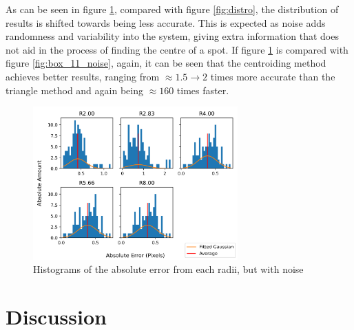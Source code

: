\documentclass[aps,pra,a4paper,nofootinbib,onecolumn,tightenlines,longbibliography,12pt,amsfonts,amssymb,amsmath,floatfix]{revtex4-2} %
\begin{document}
  As can be seen in figure \ref{fig:distro_noise}, compared with figure \ref{fig:distro}, the distribution
  of results is shifted towards being less accurate. This is expected as noise adds randomness and 
  variability into the system, giving extra information that does not aid in the process of finding the 
  centre of a spot. If figure \ref{fig:distro_noise} is compared with figure \ref{fig:box_11_noise}, again, 
  it can be seen that the centroiding method achieves better results, ranging from $\approx 1.5\rightarrow 2$
  times more accurate than the triangle method and again being $\approx 160$ times faster.

  \begin{figure}[H]
    \begin{center}
      \includegraphics[width=0.7\textwidth]{project_pics/distro_noise.png}
    \end{center}
    \caption{Histograms of the absolute error from each radii, but with noise}
    \label{fig:distro_noise}
  \end{figure}


\section{Discussion} %
\label{sec:Discussion}
\end{document}
